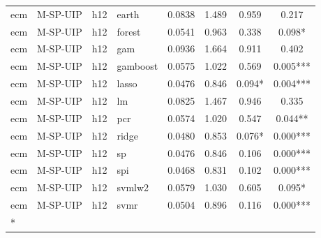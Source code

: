 \begin{ThreePartTable}
\begin{longtable}[t]{llclcccc}
\addlinespace
ecm & M-SP-UIP & h12 & earth & 0.0838 & 1.489 & 0.959 & 0.217\\
ecm & M-SP-UIP & h12 & forest & 0.0541 & 0.963 & 0.338 & 0.098*\\
ecm & M-SP-UIP & h12 & gam & 0.0936 & 1.664 & 0.911 & 0.402\\
ecm & M-SP-UIP & h12 & gamboost & 0.0575 & 1.022 & 0.569 & 0.005***\\
ecm & M-SP-UIP & h12 & lasso & 0.0476 & 0.846 & 0.094* & 0.004***\\
ecm & M-SP-UIP & h12 & lm & 0.0825 & 1.467 & 0.946 & 0.335\\
ecm & M-SP-UIP & h12 & pcr & 0.0574 & 1.020 & 0.547 & 0.044**\\
ecm & M-SP-UIP & h12 & ridge & 0.0480 & 0.853 & 0.076* & 0.000***\\
ecm & M-SP-UIP & h12 & sp & 0.0476 & 0.846 & 0.106 & 0.000***\\
ecm & M-SP-UIP & h12 & spi & 0.0468 & 0.831 & 0.102 & 0.000***\\
ecm & M-SP-UIP & h12 & svmlw2 & 0.0579 & 1.030 & 0.605 & 0.095*\\
ecm & M-SP-UIP & h12 & svmr & 0.0504 & 0.896 & 0.116 & 0.000***\\*
\end{longtable}
\end{ThreePartTable}
\endgroup{}
